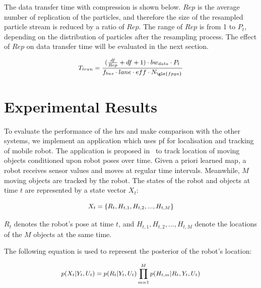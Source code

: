 The data transfer time with compression is shown below. 
$Rep$ is the average number of replication of the particles,
and therefore the size of the resampled particle stream is reduced by a ratio of $Rep$.
The range of $Rep$ is from 1 to $P_t$, depending on the distribution of particles after the resampling process.
The effect of $Rep$ on data transfer time will be evaluated in the next section.

\begin{equation}
\small
\begin{aligned}
T_{tran} = \frac{(\frac{df}{Rep} + df + 1) \cdot bw_{data} \cdot P_t}{f_{bus} \cdot lane \cdot eff \cdot N_{\gls{fpga}}}
\end{aligned}
\label{eqt:data_opt}
\end{equation}

\section{Experimental Results}
\label{sec:results}

To evaluate the performance of the \gls{hrs} and make comparison with the other systems, 
we implement an application which uses \gls{pf} for localisation and tracking of mobile robot.
The application is proposed in~\cite{montemerlo02} to track location of moving objects conditioned upon robot poses over time.
Given a priori learned map, a robot receives sensor values and moves at regular time intervals. 
Meanwhile, $M$ moving objects are tracked by the robot.
The states of the robot and objects at time $t$ are represented by a state vector $X_t$:
 
\begin{equation}
\small
\begin{aligned}
X_t = \{R_t, H_{t,1}, H_{t,2}, ..., H_{t,M}\}
\end{aligned}
\end{equation}

$R_t$ denotes the robot's pose at time $t$, and $H_{t,1}, H_{t,2}, ..., H_{t,M}$ denote the locations of the $M$ objects at the same time.

The following equation is used to represent the posterior of the robot's location:

\begin{equation}
\small
\begin{aligned}
p(X_t|Y_t,U_t) = p(R_t|Y_t,U_t) \prod_{m=1}^M p(H_{t,m}|R_t,Y_t,U_t)
\end{aligned}
\end{equation}

